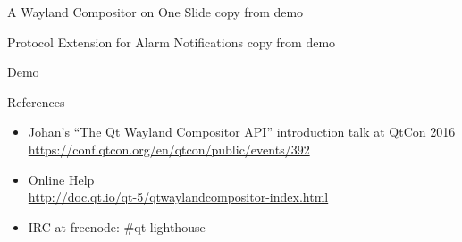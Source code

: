 \documentclass[ucs,9pt]{beamer}
\begin{document}
\begin{frame}
    {A Wayland Compositor on One Slide}
    \alert{copy from demo}
\end{frame}

\begin{frame}
    {Protocol Extension for Alarm Notifications}
    \alert{copy from demo}
\end{frame}

\begin{frame}
    {Demo}
\end{frame}

\begin{frame}
    {References}

    \begin{itemize}
        \item Johan's ``The Qt Wayland Compositor API'' introduction talk at QtCon 2016\\
            \url{https://conf.qtcon.org/en/qtcon/public/events/392}
        \item Online Help\\
            \url{http://doc.qt.io/qt-5/qtwaylandcompositor-index.html}
        \item IRC at freenode: \#qt-lighthouse
    \end{itemize}
\end{frame}

\KDElastframe
\end{document}
